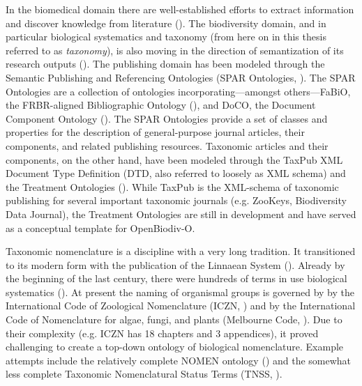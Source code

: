 In the biomedical domain there are well-established efforts to extract information and discover knowledge from literature (\cite{momtchev_expanding_2009, williams_open_2012, rebholz-schuhmann_facts_2005}). The biodiversity domain, and in particular biological systematics and taxonomy (from here on in this thesis referred to as \emph{taxonomy}), is also moving in the direction of semantization of its research outputs (\cite{kennedy_scientific_2005,penev_fast_2010, tzitzikas_integrating_2013}). The publishing domain has been modeled through the Semantic Publishing and Referencing Ontologies (SPAR Ontologies, \cite{peroni_semantic_2014}). The SPAR Ontologies are a collection of ontologies incorporating---amongst others---FaBiO, the FRBR-aligned Bibliographic Ontology (\cite{peroni_fabio_2012}), and DoCO, the Document Component Ontology (\cite{constantin_document_2016}). The SPAR Ontologies provide a set of classes and properties for the description of general-purpose journal articles, their components, and related publishing resources. Taxonomic articles and their components, on the other hand, have been modeled through the TaxPub XML Document Type Definition (DTD, also referred to loosely as XML schema) and the Treatment Ontologies (\cite{catapano_taxpub:_2010,catapano_treatment_2016}). While TaxPub is the XML-schema of taxonomic publishing for several important taxonomic journals (e.g. ZooKeys, Biodiversity Data Journal), the Treatment Ontologies are still in development and have served as a conceptual template for OpenBiodiv-O.

Taxonomic nomenclature is a discipline with a very long tradition. It transitioned to its modern form with the publication of the Linnaean System (\cite{linnaeus_systema_1758}). Already by the beginning of the last century, there were hundreds of terms in use biological systematics (\cite{witteveen_naming_2015}). At present the naming of organismal groups is governed by by the International Code of Zoological Nomenclature (ICZN, \cite{international_commission_on_zoological_nomenclature_international_1999}) and by the International Code of Nomenclature for algae, fungi, and plants (Melbourne Code, \cite{mcneill_international_2012}). Due to their complexity (e.g. ICZN has 18 chapters and 3 appendices), it proved challenging to create a top-down ontology of biological nomenclature. Example attempts include the relatively complete NOMEN ontology (\cite{dmitriev_nomen_2017}) and the somewhat less complete Taxonomic Nomenclatural Status Terms (TNSS, \cite{morris_taxonomic_nodate}).

